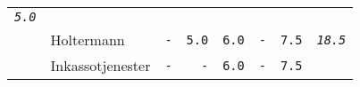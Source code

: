 \documentclass[11pt,A4paper,]{article}
\begin{document}
\begin{longtable}[]{@{}llrrrrrr@{}}
\begin{minipage}[t]{0.12\columnwidth}
\emph{\texttt{5.0}}\strut
\end{minipage}\tabularnewline
\begin{minipage}[t]{0.12\columnwidth}\raggedright\strut
\strut
\end{minipage} & \begin{minipage}[t]{0.12\columnwidth}\raggedright\strut
Holtermann\strut
\end{minipage} & \begin{minipage}[t]{0.12\columnwidth}\raggedleft\strut
\texttt{-}\strut
\end{minipage} & \begin{minipage}[t]{0.12\columnwidth}\raggedleft\strut
\texttt{5.0}\strut
\end{minipage} & \begin{minipage}[t]{0.12\columnwidth}\raggedleft\strut
\texttt{6.0}\strut
\end{minipage} & \begin{minipage}[t]{0.12\columnwidth}\raggedleft\strut
\texttt{-}\strut
\end{minipage} & \begin{minipage}[t]{0.12\columnwidth}\raggedleft\strut
\texttt{7.5}\strut
\end{minipage} & \begin{minipage}[t]{0.12\columnwidth}\raggedleft\strut
\emph{\texttt{18.5}}\strut
\end{minipage}\tabularnewline
\begin{minipage}[t]{0.12\columnwidth}\raggedright\strut
\strut
\end{minipage} & \begin{minipage}[t]{0.12\columnwidth}\raggedright\strut
Inkassotjenester\strut
\end{minipage} & \begin{minipage}[t]{0.12\columnwidth}\raggedleft\strut
\texttt{-}\strut
\end{minipage} & \begin{minipage}[t]{0.12\columnwidth}\raggedleft\strut
\texttt{-}\strut
\end{minipage} & \begin{minipage}[t]{0.12\columnwidth}\raggedleft\strut
\texttt{6.0}\strut
\end{minipage} & \begin{minipage}[t]{0.12\columnwidth}\raggedleft\strut
\texttt{-}\strut
\end{minipage} & \begin{minipage}[t]{0.12\columnwidth}\raggedleft\strut
\texttt{7.5}\strut
\end{minipage} & \begin{minipage}[t]{0.12\columnwidth}\raggedleft\strut

\end{minipage}
\end{longtable}
\end{document}
